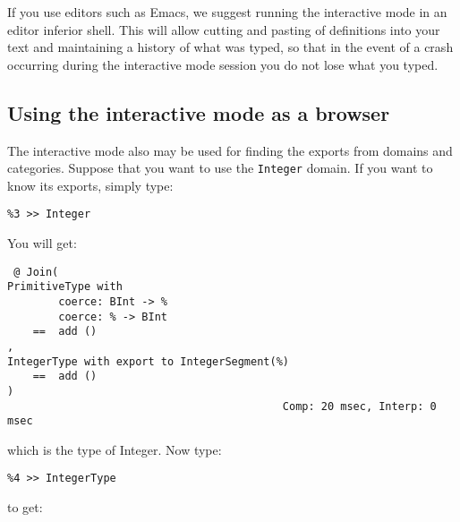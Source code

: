If you use editors such as Emacs, we suggest running the
interactive mode in an editor inferior shell.
This will allow cutting and pasting of definitions into your text and 
maintaining a history of what was typed, so that in the event of a crash
occurring during the interactive mode session you do not lose what you
typed.

\subsection{Using the interactive mode as a browser}\label{I_mode_as_browse}

The interactive mode also may be used for finding the exports from
domains and categories.  Suppose that you want to use the \verb"Integer"
domain.  If you want to know its exports, simply type:

{\small
\begin{verbatim}
%3 >> Integer
\end{verbatim}
}

You will get:

{\small
\begin{verbatim}
 @ Join(
PrimitiveType with 
        coerce: BInt -> %
        coerce: % -> BInt
    ==  add ()
, 
IntegerType with export to IntegerSegment(%)
    ==  add ()
)
                                           Comp: 20 msec, Interp: 0 msec
\end{verbatim}
}

which is the type of Integer. Now type:

{\small
\begin{verbatim}
%4 >> IntegerType
\end{verbatim}
}

to get:

